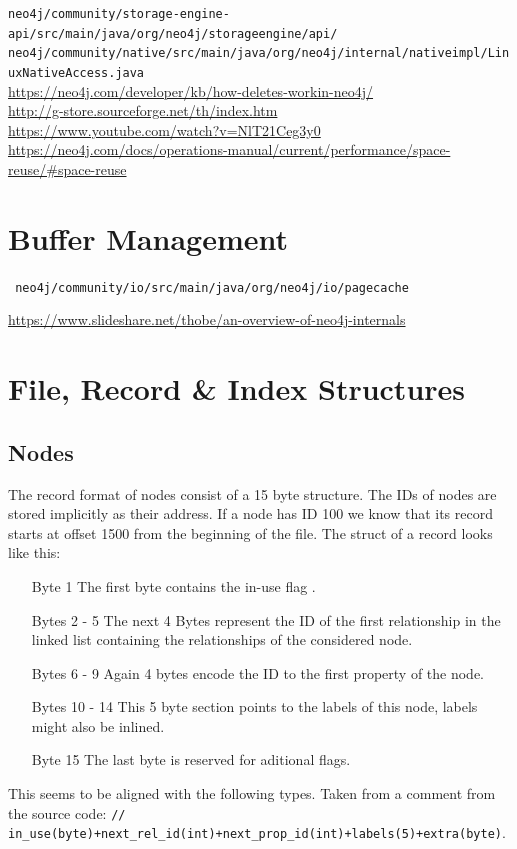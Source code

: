 \documentclass[a4paper,10pt]{article}
\begin{document}
\texttt{neo4j/community/storage-engine-api/src/main/java/org/neo4j/storageengine/api/} \\

\texttt{neo4j/community/native/src/main/java/org/neo4j/internal/nativeimpl/LinuxNativeAccess.java} \\

\href{Hpw delete works}{https://neo4j.com/developer/kb/how-deletes-workin-neo4j/} \\

\href{G-Store}{http://g-store.sourceforge.net/th/index.htm} \\

\href{Algorithms \& data structures}{https://www.youtube.com/watch?v=NlT21Ceg3y0}  \\

\href{Reusing space}{https://neo4j.com/docs/operations-manual/current/performance/space-reuse/\#space-reuse} \\



\section{Buffer Management}
\texttt{
neo4j/community/io/src/main/java/org/neo4j/io/pagecache
}

\href{Page Cache layout ??? Outdated ???}{https://www.slideshare.net/thobe/an-overview-of-neo4j-internals} \\


\section{File, Record \& Index Structures}
    \subsection{Nodes}
    The record format of nodes consist of a 15 byte structure. The IDs of nodes are stored implicitly as their address. If a node has ID 100 we know that its record starts at offset 1500 from the beginning of the file. The struct of a record looks like this:
    \begin{enumerate}
     \item[Byte 1] The first byte contains the in-use flag .
     \item[Bytes 2 - 5] The next 4 Bytes represent the ID of the first relationship in the linked list containing the relationships of the considered node.
     \item[Bytes 6 - 9] Again 4 bytes encode the ID to the first property of the node.
     \item[Bytes 10 - 14] This 5 byte section points to the labels of this node, labels might also be inlined.
     \item[Byte 15] The last byte is reserved for aditional flags.
    \end{enumerate}
    This seems to be aligned with the following types. Taken from a comment from the source code:
    \texttt{// in_use(byte)+next_rel_id(int)+next_prop_id(int)+labels(5)+extra(byte)}. \\
    
\end{document}
